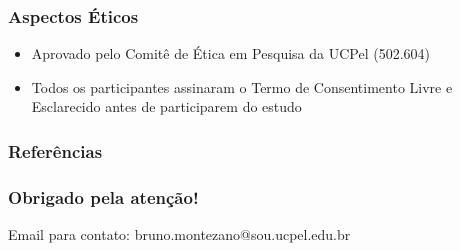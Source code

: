 \documentclass{beamer}
\begin{document}
\begin{frame}
\frametitle{Aspectos Éticos}

    \Large
    \begin{itemize}
        \item Aprovado pelo Comitê de Ética em Pesquisa da UCPel (502.604)
        \item Todos os participantes assinaram o Termo de Consentimento Livre e Esclarecido antes de participarem do estudo
    \end{itemize}

\end{frame}

\begin{frame}[allowframebreaks]
\frametitle{Referências}

\printbibliography

\end{frame}

\begin{frame}
\frametitle{Obrigado pela atenção!}

    \begin{block}{Email para contato:}
        bruno.montezano@sou.ucpel.edu.br
    \end{block}

\end{frame}
\end{document}

